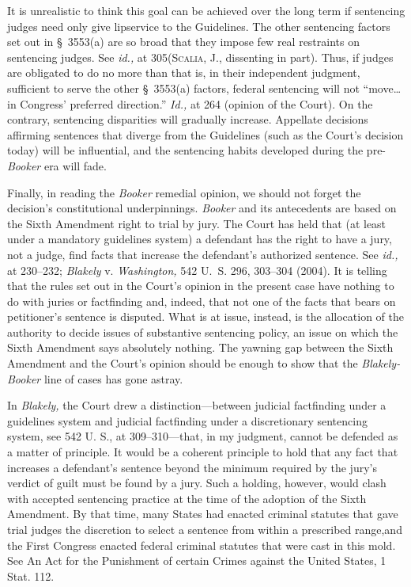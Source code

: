   It is unrealistic to think this goal can be achieved over the long
term if sentencing judges need only give lipservice to the Guidelines.
The other sentencing factors set out in \S~3553(a) are so broad that
they impose few real restraints on sentencing judges. See \emph{id.,} at
305(\textsc{Scalia,} J., dissenting in part). Thus, if judges are obligated
to do no more than \newpage  that is, in their independent judgment,
sufficient to serve the other \S~3553(a) factors, federal sentencing
will not ``move\dots in Congress' preferred direction.''
\emph{Id.,} at 264 (opinion of the Court). On the contrary, sentencing
disparities will gradually increase. Appellate decisions affirming
sentences that diverge from the Guidelines (such as the Court's
decision today) will be influential, and the sentencing habits developed
during the pre-\emph{Booker} era will fade.

  Finally, in reading the \emph{Booker} remedial opinion, we should not
forget the decision's constitutional underpinnings. \emph{Booker} and its
antecedents are based on the Sixth Amendment right to trial by jury.
The Court has held that (at least under a mandatory guidelines system)
a defendant has the right to have a jury, not a judge, find facts that
increase the defendant's authorized sentence. See \emph{id.,} at
230--232; \emph{Blakely} v. \emph{Washington,} 542 U.~S. 296, 303--304
(2004). It is telling that the rules set out in the Court's opinion
in the present case have nothing to do with juries or factfinding
and, indeed, that not one of the facts that bears on petitioner's
sentence is disputed. What is at issue, instead, is the allocation of
the authority to decide issues of substantive sentencing policy, an
issue on which the Sixth Amendment says absolutely nothing. The yawning
gap between the Sixth Amendment and the Court's opinion should be
enough to show that the \emph{Blakely-Booker} line of cases has gone
astray.

  In \emph{Blakely,} the Court drew a distinction---between judicial
factfinding under a guidelines system and judicial factfinding under a
discretionary sentencing system, see 542 U. S., at 309--310---that,
in my judgment, cannot be defended as a matter of principle. It
would be a coherent principle to hold that any fact that increases a
defendant's sentence beyond the minimum required by the jury's
verdict of guilt must be found by a jury. Such a holding, however, would
clash with accepted sentencing practice at the time of the adoption
of the Sixth Amendment. By that time, many States had \newpage  enacted
criminal statutes that gave trial judges the discretion to select a
sentence from within a prescribed range,\footnotemark[1] and the First Congress
enacted federal criminal statutes that were cast in this mold. See An
Act for the Punishment of certain Crimes against the United States, 1
Stat. 112.\footnotemark[2]



